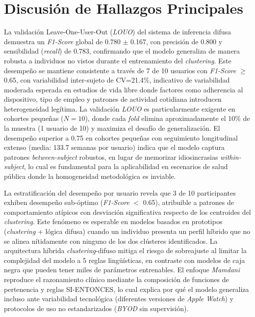 \section{Discusión de Hallazgos Principales}
\label{sec:discusion_hallazgos}

La validación Leave-One-User-Out (\textit{LOUO}) del sistema de inferencia difusa demuestra un \textit{F1-Score} global de 0.780 $\pm$ 0.167, con precisión de 0.800 y sensibilidad (\textit{recall}) de 0.783, confirmando que el modelo generaliza de manera robusta a individuos no vistos durante el entrenamiento del \textit{clustering}. Este desempeño se mantiene consistente a través de 7 de 10 usuarios con \textit{F1-Score} $\geq$ 0.65, con variabilidad inter-sujeto de CV=21.4\%, indicativo de variabilidad moderada esperada en estudios de vida libre donde factores como adherencia al dispositivo, tipo de empleo y patrones de actividad cotidiana introducen heterogeneidad legítima. La validación \textit{LOUO} es particularmente exigente en cohortes pequeñas ($N=10$), donde cada \textit{fold} elimina aproximadamente el 10\% de la muestra (1 usuario de 10) y maximiza el desafío de generalización. El desempeño superior a 0.75 en cohortes pequeñas con seguimiento longitudinal extenso (media: 133.7 semanas por usuario) indica que el modelo captura patrones \textit{between-subject} robustos, en lugar de memorizar idiosincrasias \textit{within-subject}, lo cual es fundamental para la aplicabilidad en escenarios de salud pública donde la homogeneidad metodológica es inviable.

La estratificación del desempeño por usuario revela que 3 de 10 participantes exhiben desempeño sub-óptimo (\textit{F1-Score} $<$ 0.65), atribuible a patrones de comportamiento atípicos con desviación significativa respecto de los centroides del \textit{clustering}. Este fenómeno es esperable en modelos basados en prototipos (\textit{clustering} + lógica difusa) cuando un individuo presenta un perfil híbrido que no se alinea nítidamente con ninguno de los dos clústeres identificados. La arquitectura híbrida \textit{clustering}-difuso mitiga el riesgo de sobreajuste al limitar la complejidad del modelo a 5 reglas lingüísticas, en contraste con modelos de caja negra que pueden tener miles de parámetros entrenables. El enfoque \textit{Mamdani} reproduce el razonamiento clínico mediante la composición de funciones de pertenencia y reglas SI-ENTONCES, lo cual explica por qué el modelo generaliza incluso ante variabilidad tecnológica (diferentes versiones de \textit{Apple Watch}) y protocolos de uso no estandarizados (\textit{BYOD} sin supervisión).

